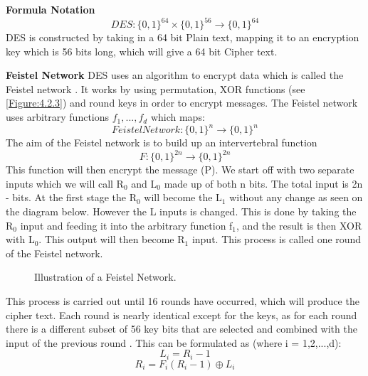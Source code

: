 \documentclass[11pt,a4paper]{report}
\begin{document}
\textbf{Formula Notation}
\begin{displaymath}
DES: \{0,1\}^{64} \times \{0,1\}^{56} \rightarrow \{0,1\}^{64}
\end{displaymath}
DES is constructed by taking in a 64 bit Plain text, mapping it to an encryption key which is 56 bits long, which will give a 64 bit Cipher text.

\textbf{Feistel Network}
DES uses an algorithm to encrypt data which is called the Feistel network \cite{DBLP:books/sp/Buchmann02}. It works by using permutation, XOR functions (see \ref{Figure:4.2.3}) and round keys in order to encrypt messages. The Feistel network uses arbitrary functions $f_{1},...,f_{d}$ which maps:
\begin{displaymath}
FeistelNetwork: \{0,1\}^n \rightarrow \{0,1\}^n
\end{displaymath}
The aim of the Feistel network is to build up an intervertebral function
\begin{displaymath}
F: \{0,1\}^{2n} \rightarrow \{0,1\}^{2n}
\end{displaymath}
This function will then encrypt the message (P). We start off with two separate inputs which we will call R$_{0}$ and L$_{0}$ made up of both n bits. The total input is 2n - bits. At the first stage the R$_{0}$ will become the L$_{1}$ without any change as seen on the diagram below. However the L inputs is changed. This is done by taking the R$_{0}$ input and feeding it into the arbitrary function f$_{1}$, and the result is then XOR with L$_{0}$. This output will then become R$_{1}$ input. This process is called one round of the Feistel network.
\begin{figure}[h]
\centering
\label{Fig: Feistel Network}
\caption{Illustration of a Feistel Network.}
\end{figure}

This process is carried out until 16 rounds have occurred, which will produce the cipher text. Each round is nearly identical except for the keys, as for each round there is a different subset of 56
key bits that are selected and combined with the input of the previous round \cite{Fabio2000LogicalSAT}.
This can be formulated as (where i = 1,2,...,d):
\begin{displaymath}
L_{i} = R_{i}-1
\end{displaymath}
\begin{displaymath}
R_{i} = F_{i} (R_{i}-1) \oplus L_{i}
\end{displaymath}
\end{document}
